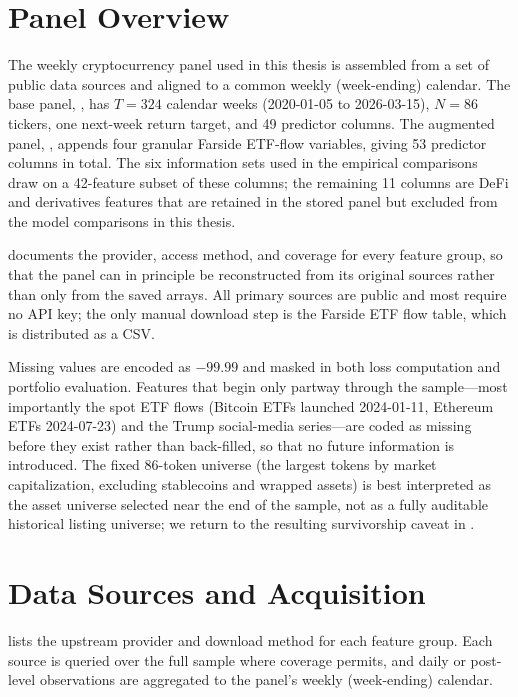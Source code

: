 \section{Panel Overview}

The weekly cryptocurrency panel used in this thesis is assembled from a set of
public data sources and aligned to a common weekly (week-ending) calendar.
The base panel, , has $T = 324$ calendar weeks
(2020-01-05 to 2026-03-15), $N = 86$ tickers, one next-week return target, and
49 predictor columns.
The augmented panel, , appends four
granular Farside ETF-flow variables, giving 53 predictor columns in total.
The six information sets used in the empirical comparisons draw on a 42-feature
subset of these columns; the remaining 11 columns are DeFi and derivatives
features that are retained in the stored panel but excluded from the model
comparisons in this thesis.

 documents the provider, access method, and coverage for
every feature group, so that the panel can in principle be reconstructed from
its original sources rather than only from the saved arrays.
All primary sources are public and most require no API key; the only manual
download step is the Farside ETF flow table, which is distributed as a CSV.

Missing values are encoded as $-99.99$ and masked in both loss computation and
portfolio evaluation.
Features that begin only partway through the sample---most importantly the spot
ETF flows (Bitcoin ETFs launched 2024-01-11, Ethereum ETFs 2024-07-23) and the
Trump social-media series---are coded as missing before they exist rather than
back-filled, so that no future information is introduced.
The fixed 86-token universe (the largest tokens by market capitalization,
excluding stablecoins and wrapped assets) is best interpreted as the asset
universe selected near the end of the sample, not as a fully auditable
historical listing universe; we return to the resulting survivorship caveat in
.

\section{Data Sources and Acquisition}
\label{sec:data:sources}

 lists the upstream provider and download method for
each feature group.
Each source is queried over the full sample where coverage permits, and daily
or post-level observations are aggregated to the panel's weekly (week-ending)
calendar.

